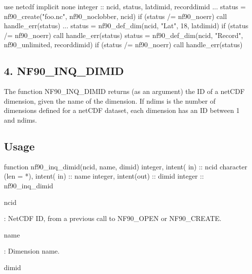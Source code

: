 \begin{DoxyCode}
\textcolor{keywordtype}{use }netcdf
\textcolor{keywordtype}{implicit none}
\textcolor{keywordtype}{integer} :: ncid, status, latdimid, recorddimid
...
status = nf90\_create(\textcolor{stringliteral}{"foo.nc"}, nf90\_noclobber, ncid)
\textcolor{keywordflow}{if} (status /= nf90\_noerr) \textcolor{keyword}{call }handle\_err(status)
...
status = nf90\_def\_dim(ncid, \textcolor{stringliteral}{"Lat"}, 18, latdimid)
\textcolor{keywordflow}{if} (status /= nf90\_noerr) \textcolor{keyword}{call }handle\_err(status)
status = nf90\_def\_dim(ncid, \textcolor{stringliteral}{"Record"}, nf90\_unlimited, recorddimid)
\textcolor{keywordflow}{if} (status /= nf90\_noerr) \textcolor{keyword}{call }handle\_err(status)
\end{DoxyCode}
\hypertarget{f90_dimensions_f90-nf90_inq_dimid}{}\subsection{4. N\+F90\+\_\+\+I\+N\+Q\+\_\+\+D\+I\+M\+I\+D }\label{f90_dimensions_f90-nf90_inq_dimid}
The function N\+F90\+\_\+\+I\+N\+Q\+\_\+\+D\+I\+M\+ID returns (as an argument) the ID of a net\+C\+DF dimension, given the name of the dimension. If ndims is the number of dimensions defined for a net\+C\+DF dataset, each dimension has an ID between 1 and ndims.

\subsection*{Usage}


\begin{DoxyCode}
\textcolor{keyword}{function }nf90\_inq\_dimid(ncid, name, dimid)
  \textcolor{keywordtype}{integer},             \textcolor{keywordtype}{intent( in)} :: ncid
  \textcolor{keywordtype}{character (len = *)}, \textcolor{keywordtype}{intent( in)} :: name
  \textcolor{keywordtype}{integer},             \textcolor{keywordtype}{intent(out)} :: dimid
  \textcolor{keywordtype}{integer}                          :: nf90\_inq\_dimid
\end{DoxyCode}


{\ttfamily ncid}

\+: Net\+C\+DF ID, from a previous call to N\+F90\+\_\+\+O\+P\+EN or N\+F90\+\_\+\+C\+R\+E\+A\+TE.

{\ttfamily name}

\+: Dimension name.

{\ttfamily dimid}

